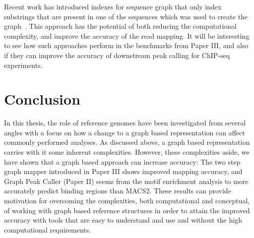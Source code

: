 Recent work has introduced indexes for sequence graph that only index substrings that are present in one of the sequences which was used to create the graph~\cite{haplotypeaware}.
This approach has the potential of both reducing the computational complexity, and improve the accuracy of the read mapping.
It will be interesting to see how such approaches perform in the benchmarks from Paper III, and also if they can improve the accuracy of downstream peak calling for ChIP-seq experiments.

\section{Conclusion}
In this thesis, the role of reference genomes have been investigated from several angles with a focus on how a change to a graph based representation can affect commonly performed analyses.
As discussed above, a graph based representation carries with it some inherent complexities.
However, these complexities aside, we have shown that a graph based approach can increase accuracy: The two step graph mapper introduced in Paper III shows improved mapping accuracy, and Graph Peak Caller (Paper II) seems from the motif enrichment analysis to more accurately predict binding regions than MACS2.
These results can provide motivation for overcoming the complexities, both computational and conceptual, of working with graph based reference structures in order to attain the improved accuracy with tools that are easy to understand and use and without the high computational requirements.

